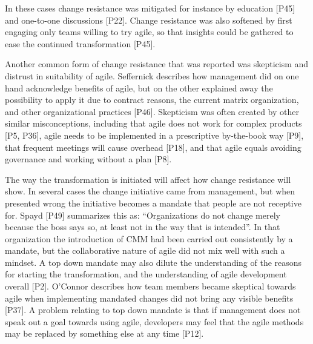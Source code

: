 In these cases change resistance was mitigated for instance by education [P45]
and one-to-one discussions [P22]. Change resistance was also softened by first
engaging only teams willing to try agile, so that insights could be gathered to
ease the continued transformation [P45].

Another common form of change resistance that was reported was skepticism and
distrust in suitability of agile. Seffernick describes how management did on one hand
acknowledge benefits of agile, but on the other explained away the possibility
to apply it due to contract reasons, the current matrix organization, and other
organizational practices [P46]. Skepticism was often created by other similar
misconceptions, including that agile does not work for complex products [P5,
P36], agile needs to be implemented in a prescriptive by-the-book way [P9], that
frequent meetings will cause overhead [P18], and that agile equals avoiding
governance and working without a plan [P8].




The way the transformation is initiated will affect how change resistance will
show. In several cases the change initiative came from management, but when
presented wrong the initiative becomes a mandate that people are not receptive
for. Spayd [P49] summarizes this as: ``Organizations do not change merely
because the boss says so, at least not in the way that is intended''. In that
organization the introduction of CMM had been carried out consistently by a
mandate, but the collaborative nature of agile did not mix well with such a
mindset. A top down mandate may also dilute the understanding of the reasons for
starting the transformation, and the understanding of agile development overall
[P2]. O'Connor describes how team members became skeptical towards agile when
implementing mandated changes did not bring any visible benefits [P37].
A problem relating to top down mandate is that if management does not speak out
a goal towards using agile, developers may feel that the agile methods may be
replaced by something else at any time [P12].

